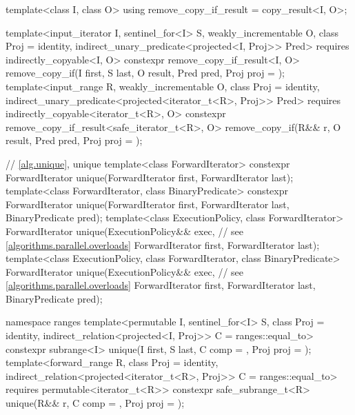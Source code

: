 \begin{codeblock}
{{    template<class I, class O>
    using remove_copy_if_result = copy_result<I, O>;

    template<input_iterator I, sentinel_for<I> S, weakly_incrementable O,
             class Proj = identity, indirect_unary_predicate<projected<I, Proj>> Pred>
      requires indirectly_copyable<I, O>
      constexpr remove_copy_if_result<I, O>
        remove_copy_if(I first, S last, O result, Pred pred, Proj proj = {});
    template<input_range R, weakly_incrementable O, class Proj = identity,
             indirect_unary_predicate<projected<iterator_t<R>, Proj>> Pred>
      requires indirectly_copyable<iterator_t<R>, O>
      constexpr remove_copy_if_result<safe_iterator_t<R>, O>
        remove_copy_if(R&& r, O result, Pred pred, Proj proj = {});
  }

  // \ref{alg.unique}, unique
  template<class ForwardIterator>
    constexpr ForwardIterator unique(ForwardIterator first, ForwardIterator last);
  template<class ForwardIterator, class BinaryPredicate>
    constexpr ForwardIterator unique(ForwardIterator first, ForwardIterator last,
                                     BinaryPredicate pred);
  template<class ExecutionPolicy, class ForwardIterator>
    ForwardIterator unique(ExecutionPolicy&& exec,              // see \ref{algorithms.parallel.overloads}
                           ForwardIterator first, ForwardIterator last);
  template<class ExecutionPolicy, class ForwardIterator, class BinaryPredicate>
    ForwardIterator unique(ExecutionPolicy&& exec,              // see \ref{algorithms.parallel.overloads}
                           ForwardIterator first, ForwardIterator last,
                           BinaryPredicate pred);

  namespace ranges {
    template<permutable I, sentinel_for<I> S, class Proj = identity,
             indirect_relation<projected<I, Proj>> C = ranges::equal_to>
      constexpr subrange<I> unique(I first, S last, C comp = {}, Proj proj = {});
    template<forward_range R, class Proj = identity,
             indirect_relation<projected<iterator_t<R>, Proj>> C = ranges::equal_to>
      requires permutable<iterator_t<R>>
      constexpr safe_subrange_t<R>
        unique(R&& r, C comp = {}, Proj proj = {});
  }

}
\end{codeblock}

